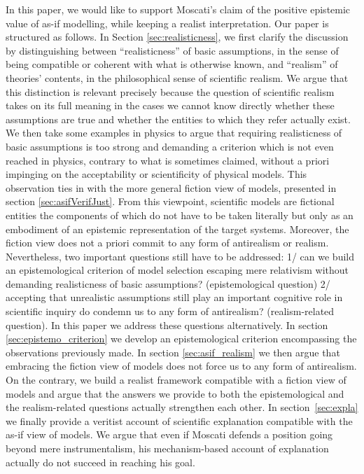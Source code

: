 \documentclass[a4paper,11pt]{article}
\theoremstyle{definition}
\begin{document}
In this paper, we would like to support Moscati's claim of the positive epistemic value of as-if modelling, while keeping a realist interpretation. Our paper is structured as follows. In Section \ref{sec:realisticness}, we first clarify the discussion by distinguishing between “realisticness” of basic assumptions, in the sense of being compatible or coherent with what is otherwise known, and “realism” of theories’ contents, in the philosophical sense of scientific realism. We argue that this distinction is relevant precisely because the question of scientific realism takes on its full meaning in the cases we cannot know directly whether these assumptions are true and whether the entities to which they refer actually exist. We then take some examples in physics to argue that requiring realisticness of basic assumptions is too strong and demanding a criterion which is not even reached in physics, contrary to what is sometimes claimed, without a priori impinging on the acceptability or scientificity of physical models. This observation ties in with the more general fiction view of models, presented in section \ref{sec:asifVerifJust}. From this viewpoint, scientific models are fictional entities the components of which do not have to be taken literally but only as an embodiment of an epistemic representation of the target systems. Moreover, the fiction view does not a priori commit to any form of antirealism or realism. Nevertheless, two important questions still have to be addressed: 1/ can we build an epistemological criterion of model selection escaping mere relativism without demanding realisticness of basic assumptions? (epistemological question) 2/ accepting that unrealistic assumptions still play an important cognitive role in scientific inquiry do condemn us to any form of antirealism? (realism-related question). In this paper we address these questions alternatively. In section \ref{sec:epistemo_criterion} we develop an epistemological criterion encompassing the observations previously made. In section \ref{sec:asif_realism} we then argue that embracing the fiction view of models does not force us to any form of antirealism. On the contrary, we build a realist framework compatible with a fiction view of models and argue that the answers we provide to both the epistemological and the realism-related questions actually strengthen each other. In section~\ref{sec:expla} we finally provide a veritist account of scientific explanation compatible with the as-if view of models. We argue that even if Moscati defends a position going beyond mere instrumentalism, his mechanism-based account of explanation actually do not succeed in reaching his goal. 
\end{document}
